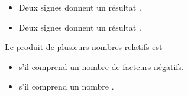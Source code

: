\begin{attention}
\begin{itemize}
    \item Deux signes  donnent un résultat .
    \item Deux signes  donnent un résultat .
\end{itemize}
\end{attention}

\begin{prop}
    Le produit de plusieurs nombres relatifs est 
    \begin{itemize}
        \item {} s'il comprend un nombre  de facteurs
            négatifs.
        \item {} s'il comprend un nombre .
    \end{itemize}
\end{prop}
